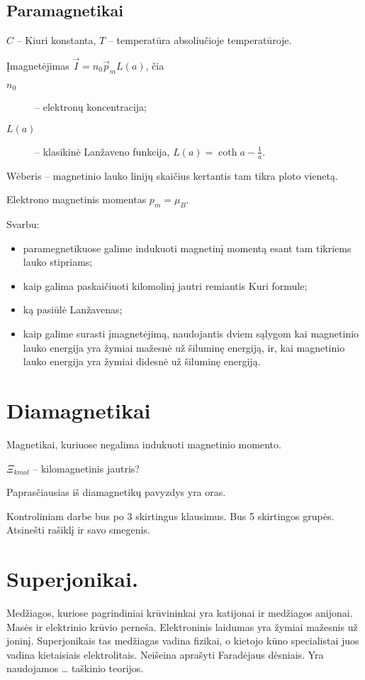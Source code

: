 \subsection{Paramagnetikai}

$C$ – Kiuri konstanta,
$T$ – temperatūra absoliučioje temperatūroje.

Įmagnetėjimas $\vec{I} = n_{0}\vec{p}_{m}L(a)$, čia
\begin{description}
  \item[$n_{0}$] – elektronų koncentracija;
  \item[$L(a)$] – klasikinė Lanžaveno funkcija,
    $L(a) = \coth a - \frac{1}{a}$.
\end{description}

Wėberis – magnetinio lauko linijų skaičius kertantis tam tikra ploto
vienetą.

Elektrono magnetinis momentas $p_{m} = \mu_{B}$.

Svarbu:
\begin{itemize}
  \item paramegnetikuose galime indukuoti magnetinį momentą esant
    tam tikriems lauko stipriams;
  \item kaip galima paskaičiuoti kilomolinį jautri remiantis Kuri
    formule;
  \item ką pasiūlė Lanžavenas;
  \item kaip galime surasti įmagnetėjimą, naudojantis dviem sąlygom
    kai magnetinio lauko energija yra žymiai mažesnė už šiluminę
    energiją, ir, kai magnetinio lauko energija yra žymiai didesnė
    už šiluminę energiją.
\end{itemize}

\section{Diamagnetikai}

Magnetikai, kuriuose negalima indukuoti magnetinio momento.

$\Xi_{kmol}$ – kilomagnetinis jautris?

Paprasčiausias iš diamagnetikų pavyzdys yra oras.

Kontroliniam darbe bus po 3 skirtingus klausimus. Bus 5 skirtingos
grupės. Atsinešti rašiklį ir savo smegenis.

\section{Superjonikai.}
Medžiagos, kuriose pagrindiniai krūvininkai yra katijonai ir medžiagos
anijonai. Masės ir elektrinio krūvio perneša. Elektroninis laidumas yra
žymiai mažesnis už joninį. Superjonikais tas medžiagas vadina fizikai,
o kietojo kūno specialistai juos vadina kietaisiais elektrolitais.
Neišeina aprašyti Faradėjaus dėsniais. Yra naudojamos … taškinio teorijos.
